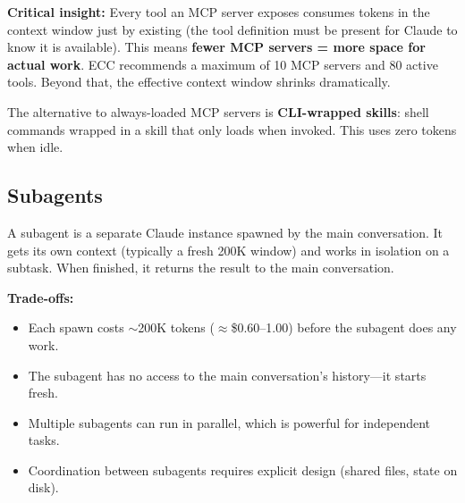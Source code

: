 \documentclass[11pt,a4paper]{article}
\begin{document}
\textbf{Critical insight:} Every tool an MCP server exposes consumes tokens in the context window just by existing (the tool definition must be present for Claude to know it is available). This means \textbf{fewer MCP servers = more space for actual work}. ECC recommends a maximum of 10 MCP servers and 80 active tools. Beyond that, the effective context window shrinks dramatically.

The alternative to always-loaded MCP servers is \textbf{CLI-wrapped skills}: shell commands wrapped in a skill that only loads when invoked. This uses zero tokens when idle.

\subsection{Subagents}
\label{sec:subagents}

A subagent is a separate Claude instance spawned by the main conversation. It gets its own context (typically a fresh 200K window) and works in isolation on a subtask. When finished, it returns the result to the main conversation.

\begin{center}
\end{center}

\textbf{Trade-offs:}
\begin{itemize}
  \item Each spawn costs $\sim$200K tokens ($\approx$\$0.60--1.00) before the subagent does any work.
  \item The subagent has no access to the main conversation's history---it starts fresh.
  \item Multiple subagents can run in parallel, which is powerful for independent tasks.
  \item Coordination between subagents requires explicit design (shared files, state on disk).
\end{itemize}
\end{document}
